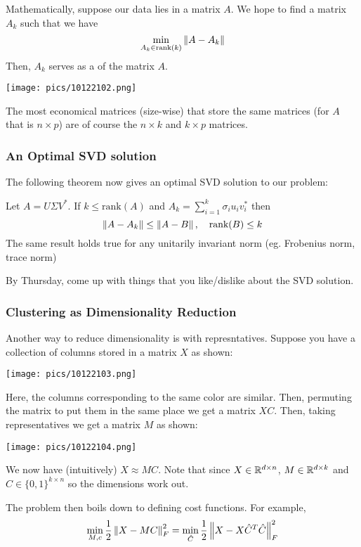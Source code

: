 \documentclass[11pt]{scrartcl}
\begin{document}
Mathematically, suppose our data lies in a matrix $A$. We hope to find a matrix $A_k$ such that we have $$\min_{A_k \in \text{rank}(k)}\left\lVert A-A_k\right\rVert$$
Then, $A_k$ serves as a  of the matrix $A$. 
\begin{center}
    \texttt{[image: pics/10122102.png]}
\end{center}
The most economical matrices (size-wise) that store the same matrices (for $A$ that is $n \times p$) are of course the $n \times k$ and $k \times p$ matrices. 

\subsubsection{An Optimal SVD solution}
The following theorem now gives an optimal SVD solution to our problem:

\begin{thm}
Let $A=U\Sigma V^*$. If $k \le \text{rank}(A)$ and $A_k=\sum_{i=1}^{k}\sigma_i u_i v_i^*$ then $$\left\lVert A-A_k\right\rVert \le \left\lVert A-B\right\rVert, \quad \text{rank}(B) \le k$$
The same result holds true for any unitarily invariant norm (eg. Frobenius norm, trace norm)
\end{thm}

By Thursday, come up with things that you like/dislike about the SVD solution. 

\subsubsection{Clustering as Dimensionality Reduction}
Another way to reduce dimensionality is with represntatives. Suppose you have a collection of columns stored in a matrix $X$ as shown:
\begin{center}
    \texttt{[image: pics/10122103.png]}
\end{center}
Here, the columns corresponding to the same color are similar. Then, permuting the matrix to put them in the same place we get a matrix $XC$. Then, taking representatives we get a matrix $M$ as shown:
\begin{center}
    \texttt{[image: pics/10122104.png]}
\end{center}
We now have (intuitively) $X \approx MC$. Note that since $X \in \mathbb{R}^{d \times n}$, $M \in \mathbb{R}^{d \times k}$ and $C \in \{0,1\}^{k \times n}$ so the dimensions work out. 

The problem then boils down to defining cost functions. For example, $$\min_{M,c} \frac{1}{2}\left\lVert X-MC\right\rVert^2_{F}=\min_{\hat{C}}\frac{1}{2}\left\lVert X-X\hat{C}^{T}\hat{C}\right\rVert^2_{F}$$
\end{document}
